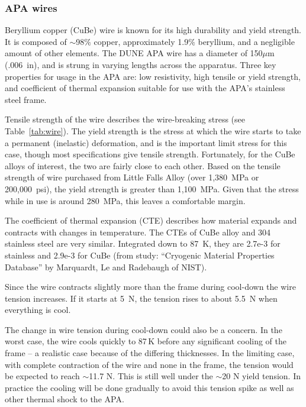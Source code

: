 \subsubsection{APA wires}
\label{subsec:apa_wires}

Beryllium copper (CuBe) wire is known for its high durability and yield strength. It is composed of $\sim$98$\%$ copper, approximately 1.9$\%$ beryllium, and a negligible amount of other elements. The DUNE APA wire has a diameter of 150$\mu$m (.006~in), and is strung in varying lengths across the apparatus. Three key properties for usage in the APA are: low resistivity, high tensile or yield strength, and coefficient of thermal expansion suitable for use with the APA's stainless steel frame.

Tensile strength of the wire describes the wire-breaking stress (see Table~\ref{tab:wire}).  The yield strength is the stress at which the wire starts to take a permanent (inelastic) deformation, and is the important limit stress for this case, though most specifications give tensile strength.  Fortunately, for the CuBe alloys of interest, the two are fairly close to each other.  Based on the tensile strength of wire purchased from Little Falls Alloy (over 1,380~MPa or 200,000~psi), the yield strength is greater than 1,100~MPa.  Given that the stress while in use is around 280~MPa, this leaves a comfortable margin.

The coefficient of thermal expansion (CTE) describes how material expands and contracts with changes in temperature.  The CTEs of CuBe alloy and 304 stainless steel are very similar.  Integrated down to 87~K, they are 2.7e-3 for stainless and 2.9e-3 for CuBe  (from study: ``Cryogenic Material Properties Database'' by Marquardt, Le and Radebaugh of NIST).

Since the wire contracts slightly more than the frame during cool-down the wire tension increases.  If it starts at 5~N, the tension rises to about 5.5~N when everything is cool.  

The change in wire tension during cool-down could also be a concern.  In the worst case, the wire
 cools quickly to 87\,K before any significant cooling of the frame  -- a realistic case because of the differing thicknesses.  In the limiting case, with complete contraction of the wire and none in the frame, the tension would be expected to reach $\sim$11.7 N.  This is still well under the $\sim$20 N yield tension.
In practice the cooling will be done gradually to avoid this tension spike as well as other thermal shock to the APA.

